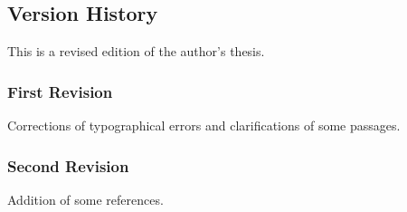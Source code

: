 \cleardoublepage

\subsection*{Version History}

This is a revised edition of the author's thesis.

\subsubsection*{First Revision}

Corrections of typographical errors and clarifications of some passages.

\subsubsection*{Second Revision}

Addition of some references.